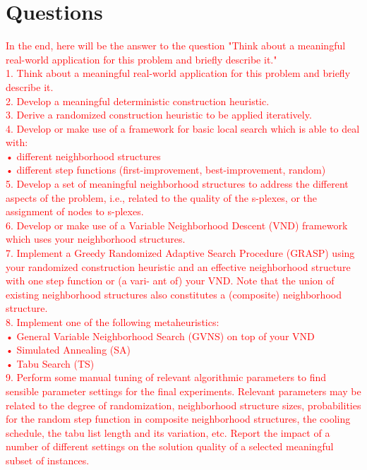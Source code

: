 \section{Questions}

\textcolor{red}{
In the end, here will be the answer to the question "Think about a meaningful real-world application for this problem and briefly describe it."\\
1. Think about a meaningful real-world application for this problem and briefly describe it.\\
2. Develop a meaningful deterministic construction heuristic.\\
3. Derive a randomized construction heuristic to be applied iteratively.\\
4. Develop or make use of a framework for basic local search which is able to deal with:\\
• different neighborhood structures\\
• different step functions (first-improvement, best-improvement, random)\\
5. Develop a set of meaningful neighborhood structures to address the different aspects of the problem,
i.e., related to the quality of the s-plexes, or the assignment of nodes to s-plexes.\\
6. Develop or make use of a Variable Neighborhood Descent (VND) framework which uses your
neighborhood structures.\\
7. Implement a Greedy Randomized Adaptive Search Procedure (GRASP) using your randomized
construction heuristic and an effective neighborhood structure with one step function or (a vari-
ant of) your VND. Note that the union of existing neighborhood structures also constitutes a
(composite) neighborhood structure.\\
8. Implement one of the following metaheuristics:\\
• General Variable Neighborhood Search (GVNS) on top of your VND\\
• Simulated Annealing (SA)\\
• Tabu Search (TS)\\
9. Perform some manual tuning of relevant algorithmic parameters to find sensible parameter settings
for the final experiments. Relevant parameters may be related to the degree of randomization,
neighborhood structure sizes, probabilities for the random step function in composite neighborhood
structures, the cooling schedule, the tabu list length and its variation, etc. Report the impact of a
number of different settings on the solution quality of a selected meaningful subset of instances.
}
